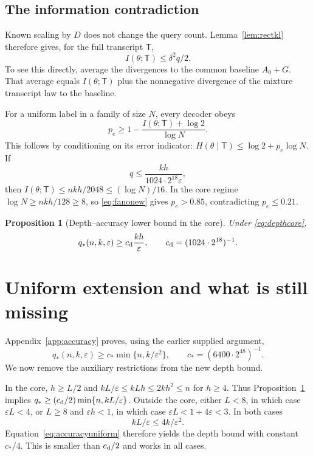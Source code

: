 \documentclass[11pt]{article}
\newtheorem{proposition}[theorem]{Proposition}
\theoremstyle{remark}
\newcommand{\eps}{\varepsilon}
\begin{document}
\subsection{The information contradiction}

Known scaling by $D$ does not change the query count. Lemma~\ref{lem:rectkl}
therefore gives, for the full transcript $\mathsf T$,
\[
 I(\theta;\mathsf T)\le\delta^2q/2.
\]
To see this directly, average the divergences to the common baseline
$A_0+G$. That average equals $I(\theta;\mathsf T)$ plus the nonnegative
divergence of the mixture transcript law to the baseline.

For a uniform label in a family of size $N$, every decoder obeys
\begin{equation}\label{eq:fanonew}
 p_e\ge1-\frac{I(\theta;\mathsf T)+\log2}{\log N}.
\end{equation}
This follows by conditioning on its error indicator:
$H(\theta\mid\mathsf T)\le\log2+p_e\log N$.
If
\[
 q\le\frac{kh}{1024\cdot2^{18}\eps},
\]
then $I(\theta;\mathsf T)\le nkh/2048\le(\log N)/16$.
In the core regime $\log N\ge nkh/128\ge8$, so \eqref{eq:fanonew} gives
$p_e>0.85$, contradicting $p_e\le0.21$.

\begin{proposition}[Depth--accuracy lower bound in the core]\label{prop:depthcore}
Under \eqref{eq:depthcore},
\[
 q_*(n,k,\eps)\ge c_{\rm d}\frac{kh}{\eps},
 \qquad c_{\rm d}=(1024\cdot2^{18})^{-1}.
\]
\end{proposition}

\section{Uniform extension and what is still missing}\label{sec:extension}

Appendix~\ref{app:accuracy} proves, using the earlier supplied argument,
\begin{equation}\label{eq:accuracyuniform}
 q_*(n,k,\eps)\ge c_*\min\{n,k/\eps^2\},
 \qquad c_*=(6400\cdot2^{48})^{-1}.
\end{equation}
We now remove the auxiliary restrictions from the new depth bound.

In the core, $h\ge L/2$ and
$kL/\eps\le kLh\le2kh^2\le n$ for $h\ge4$.
Thus Proposition~\ref{prop:depthcore} implies
$q_*\ge(c_{\rm d}/2)\min\{n,kL/\eps\}$.
Outside the core, either $L<8$, in which case $\eps L<4$, or $L\ge8$ and
$\eps h<1$, in which case $\eps L<1+4\eps<3$.
In both cases
\[
 kL/\eps\le4k/\eps^2.
\]
Equation~\eqref{eq:accuracyuniform} therefore yields the depth bound with
constant $c_*/4$. This is smaller than $c_{\rm d}/2$ and works in all cases.
\end{document}
